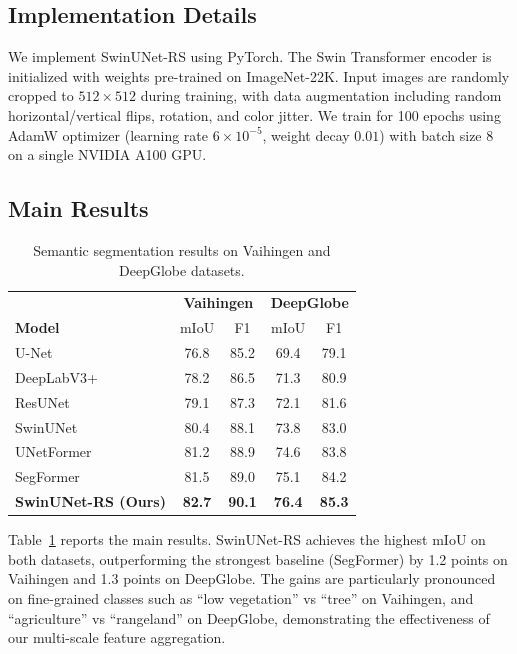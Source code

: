 \documentclass[conference]{IEEEtran}
\begin{document}
\subsection{Implementation Details}\label{sec:impl}

We implement SwinUNet-RS using PyTorch. The Swin Transformer encoder is initialized
with weights pre-trained on ImageNet-22K. Input images are randomly cropped to $512 \times 512$
during training, with data augmentation including random horizontal/vertical flips,
rotation, and color jitter. We train for 100 epochs using AdamW optimizer
(learning rate $6\times 10^{-5}$, weight decay $0.01$) with batch size 8 on a single NVIDIA A100 GPU.

\subsection{Main Results}\label{sec:main_results}

\begin{table}[t]
\centering
\caption{Semantic segmentation results on Vaihingen and DeepGlobe datasets.}
\label{tab:main}
\small
\setlength{\tabcolsep}{3pt}
\begin{tabular}{lcc|cc}
\toprule
& \multicolumn{2}{c|}{\textbf{Vaihingen}} & \multicolumn{2}{c}{\textbf{DeepGlobe}} \\
\textbf{Model} & mIoU & F1 & mIoU & F1 \\
\midrule
U-Net~\cite{ronneberger2015unet} & 76.8 & 85.2 & 69.4 & 79.1 \\
DeepLabV3+~\cite{chen2018deeplabv3plus} & 78.2 & 86.5 & 71.3 & 80.9 \\
ResUNet~\cite{zhang2018resunet} & 79.1 & 87.3 & 72.1 & 81.6 \\
SwinUNet~\cite{cao2022swinunet} & 80.4 & 88.1 & 73.8 & 83.0 \\
UNetFormer~\cite{wang2022unetformer} & 81.2 & 88.9 & 74.6 & 83.8 \\
SegFormer~\cite{xie2021segformer} & 81.5 & 89.0 & 75.1 & 84.2 \\
\midrule
\textbf{SwinUNet-RS (Ours)} & \textbf{82.7} & \textbf{90.1} & \textbf{76.4} & \textbf{85.3} \\
\bottomrule
\end{tabular}
\end{table}

Table~\ref{tab:main} reports the main results. SwinUNet-RS achieves the highest mIoU
on both datasets, outperforming the strongest baseline (SegFormer) by 1.2 points on Vaihingen
and 1.3 points on DeepGlobe. The gains are particularly pronounced on fine-grained classes
such as ``low vegetation'' vs ``tree'' on Vaihingen, and ``agriculture'' vs ``rangeland''
on DeepGlobe, demonstrating the effectiveness of our multi-scale feature aggregation.
\end{document}

